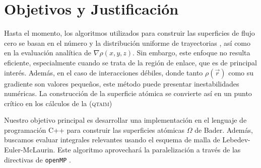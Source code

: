 	\section{Objetivos y Justificación}
    Hasta el momento, los algoritmos utilizados para construir las superficies de flujo cero se basan en el 
    número y la distribución uniforme de trayectorias 	\cite{biegler1981,popelier96}, así como en la evaluación 
    analítica de $\nabla\rho(x,y,z)$. Sin embargo, este enfoque no resulta eficiente, especialmente 
    cuando se trata de la región de enlace, que es de principal interés. Además, en el caso de interacciones débiles, 
    donde tanto $\rho(\vec{r})$ como su gradiente son valores pequeños, este método puede presentar inestabilidades
     numéricas. La construcción de la superficie atómica se convierte así en un punto crítico en los cálculos 
     de la (\textsc{qtaim})

	Nuestro objetivo principal es desarrollar una  implementación en el lenguaje de programación C++
	para construir las superficies atómicas  $\Omega$ de Bader.  Además, buscamos evaluar integrales 
	relevantes usando el esquema de malla de Lebedev-Euler-McLaurin. Este algoritmo aprovechará la 
	paralelización a través de las directivas de \texttt{openMP} \cite{openmp}.
%
